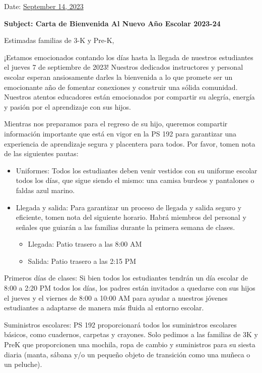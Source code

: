 \documentclass[12pt,letterpaper]{article}
\begin{document}
\vspace*{0.5in}
Date: \href{https://www.ps192.org/apps/bbmessages/show_bbm.jsp?REC_ID=139439}{September 14, 2023} 

\textbf{Subject: Carta de Bienvenida Al Nuevo Año Escolar 2023-24}

Estimadas familias de 3-K y Pre-K,

¡Estamos emocionados contando los días hasta la llegada de nuestros estudiantes el jueves
7 de septiembre de 2023! Nuestros dedicados instructores y personal escolar esperan
ansiosamente darles la bienvenida a lo que promete ser un emocionante año de fomentar
conexiones y construir una sólida comunidad. Nuestros atentos educadores están emocionados
por compartir su alegría, energía y pasión por el aprendizaje con sus hijos.

Mientras nos preparamos para el regreso de su hijo, queremos compartir información 
importante que está en vigor en la PS 192 para garantizar una experiencia de aprendizaje
segura y placentera para todos. Por favor, tomen nota de las siguientes pautas:
	\begin{itemize}
	\item Uniformes: Todos los estudiantes deben venir vestidos con su uniforme escolar
	todos los días, que sigue siendo el mismo: una camisa burdeos y pantalones o faldas
	azul marino.
	\item Llegada y salida: Para garantizar un proceso de llegada y salida seguro y
	eficiente, tomen nota del siguiente horario. Habrá miembros del personal y señales que
	guiarán a las familias durante la primera semana de clases.  
		\begin{itemize}
		\item Llegada: Patio trasero a las 8:00 AM
		\item Salida: Patio trasero a las 2:15 PM
		\end{itemize}
	\end{itemize}
		
Primeros días de clases: Si bien todos los estudiantes tendrán un día escolar de 8:00 a 2:20 PM todos los días, los padres están invitados a quedarse con sus hijos el jueves y el
viernes de 8:00 a 10:00 AM para ayudar a nuestros jóvenes estudiantes a adaptarse de 
manera más fluida al entorno escolar.

Suministros escolares: PS 192 proporcionará todos los suministros escolares básicos, como
cuadernos, carpetas y crayones. Solo pedimos a las familias de 3K y PreK que proporcionen
una mochila, ropa de cambio y suministros para su siesta diaria (manta, sábana y/o un
pequeño objeto de transición como una muñeca o un peluche).
\end{document}
